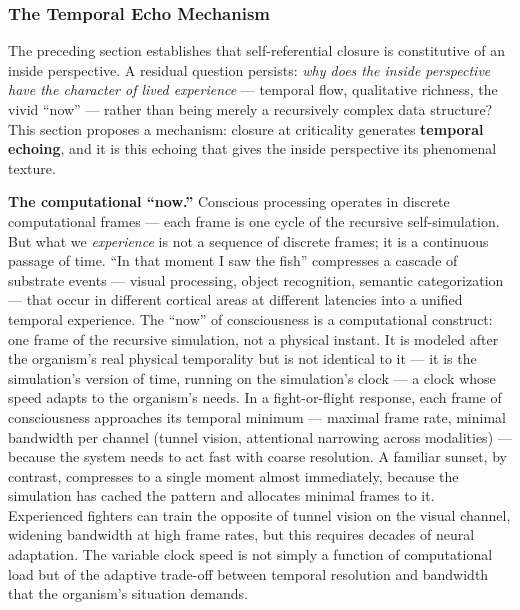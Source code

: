 \documentclass[12pt]{article}
\newcommand{\revstart}{}
\begin{document}
{\revstart\subsubsection{The Temporal Echo Mechanism}

The preceding section establishes that self-referential closure is constitutive of an inside perspective. A residual question persists: \emph{why does the inside perspective have the character of lived experience} --- temporal flow, qualitative richness, the vivid ``now'' --- rather than being merely a recursively complex data structure? This section proposes a mechanism: closure at criticality generates \textbf{temporal echoing}, and it is this echoing that gives the inside perspective its phenomenal texture.

\textbf{The computational ``now.''} Conscious processing operates in discrete computational frames --- each frame is one cycle of the recursive self-simulation. But what we \emph{experience} is not a sequence of discrete frames; it is a continuous passage of time. ``In that moment I saw the fish'' compresses a cascade of substrate events --- visual processing, object recognition, semantic categorization --- that occur in different cortical areas at different latencies into a unified temporal experience. The ``now'' of consciousness is a computational construct: one frame of the recursive simulation, not a physical instant. It is modeled after the organism's real physical temporality but is not identical to it --- it is the simulation's version of time, running on the simulation's clock --- a clock whose speed adapts to the organism's needs. In a fight-or-flight response, each frame of consciousness approaches its temporal minimum --- maximal frame rate, minimal bandwidth per channel (tunnel vision, attentional narrowing across modalities) --- because the system needs to act fast with coarse resolution. A familiar sunset, by contrast, compresses to a single moment almost immediately, because the simulation has cached the pattern and allocates minimal frames to it. Experienced fighters can train the opposite of tunnel vision on the visual channel, widening bandwidth at high frame rates, but this requires decades of neural adaptation. The variable clock speed is not simply a function of computational load but of the adaptive trade-off between temporal resolution and bandwidth that the organism's situation demands.

}
\end{document}
